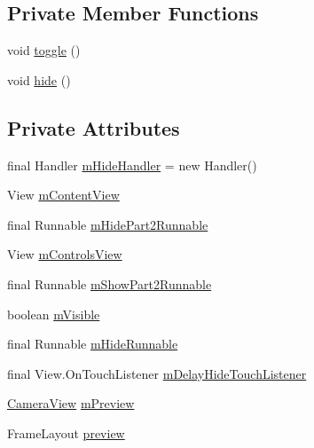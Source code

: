 \subsection*{Private Member Functions}
\begin{DoxyCompactItemize}
\item 
void \hyperlink{classsdem_1_1unimore_1_1com_1_1sdemapp_1_1_fullscreen_activity_ac1d00a3d08c1320338db8cf01d4b19e1}{toggle} ()
\item 
void \hyperlink{classsdem_1_1unimore_1_1com_1_1sdemapp_1_1_fullscreen_activity_a76e0f8b9e6b1bb7510336190cf6440ae}{hide} ()
\end{DoxyCompactItemize}
\subsection*{Private Attributes}
\begin{DoxyCompactItemize}
\item 
final Handler \hyperlink{classsdem_1_1unimore_1_1com_1_1sdemapp_1_1_fullscreen_activity_ad4475520f7d10bee6847afe83221d311}{m\+Hide\+Handler} = new Handler()
\item 
View \hyperlink{classsdem_1_1unimore_1_1com_1_1sdemapp_1_1_fullscreen_activity_a16c3f7ad16b7cb1e5edd2fb951bca41f}{m\+Content\+View}
\item 
final Runnable \hyperlink{classsdem_1_1unimore_1_1com_1_1sdemapp_1_1_fullscreen_activity_a2b840b0dda8f24f21123d96b06a6576d}{m\+Hide\+Part2\+Runnable}
\item 
View \hyperlink{classsdem_1_1unimore_1_1com_1_1sdemapp_1_1_fullscreen_activity_a6ee2fd73847cb62532e245338c584285}{m\+Controls\+View}
\item 
final Runnable \hyperlink{classsdem_1_1unimore_1_1com_1_1sdemapp_1_1_fullscreen_activity_aca929d5b4bff4f4a52c843e94ea54433}{m\+Show\+Part2\+Runnable}
\item 
boolean \hyperlink{classsdem_1_1unimore_1_1com_1_1sdemapp_1_1_fullscreen_activity_ae802b628029f2684f3f26db19a4cf784}{m\+Visible}
\item 
final Runnable \hyperlink{classsdem_1_1unimore_1_1com_1_1sdemapp_1_1_fullscreen_activity_ac827eae51a46edd22c566d19809e6bd1}{m\+Hide\+Runnable}
\item 
final View.\+On\+Touch\+Listener \hyperlink{classsdem_1_1unimore_1_1com_1_1sdemapp_1_1_fullscreen_activity_a04fe84a1508ac134e93696b9a8706af9}{m\+Delay\+Hide\+Touch\+Listener}
\item 
\hyperlink{classsdem_1_1unimore_1_1com_1_1sdemapp_1_1_camera_view}{Camera\+View} \hyperlink{classsdem_1_1unimore_1_1com_1_1sdemapp_1_1_fullscreen_activity_a84c4f3cc1fb84eba7a4cddbc27f4e11b}{m\+Preview}
\item 
Frame\+Layout \hyperlink{classsdem_1_1unimore_1_1com_1_1sdemapp_1_1_fullscreen_activity_a7a18a5ddea253a2942b56ac95b9af864}{preview}
\end{DoxyCompactItemize}
